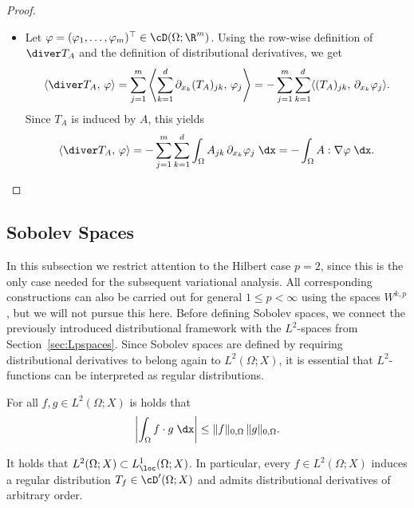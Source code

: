 \begin{proof}
\begin{itemize}
		\item[iii)] Let $\varphi=(\varphi_1,\ldots,\varphi_m)^\top\in\cD(\Omega;\R^m)$. Using the row-wise definition of $\diver T_A$ and the definition of distributional derivatives, we get
		      \begin{equation*}
			      \langle \diver T_A,\,\varphi\rangle
			      =
			      \sum_{j=1}^m \left\langle \sum_{k=1}^d \partial_{x_k}(T_A)_{jk},\,\varphi_j\right\rangle
			      =
			      -\sum_{j=1}^m\sum_{k=1}^d \langle (T_A)_{jk},\,\partial_{x_k}\varphi_j\rangle.
		      \end{equation*}
		      Since $T_A$ is induced by $A$, this yields
		      \begin{equation*}
			      \langle \diver T_A,\,\varphi\rangle
			      =
			      -\sum_{j=1}^m\sum_{k=1}^d \int_\Omega A_{jk}\,\partial_{x_k}\varphi_j\;\dx
			      =
			      -\int_\Omega A:\nabla\varphi\;\dx.
		      \end{equation*}
	\end{itemize}
\end{proof}

\subsection{Sobolev Spaces}

In this subsection we restrict attention to the Hilbert case $p=2$, since this is the only case needed for the subsequent variational analysis. All corresponding constructions can also be carried out for general $1\le p<\infty$ using the spaces $W^{k,p}$, but we will not pursue this here. Before defining Sobolev spaces, we connect the previously introduced distributional framework with the $L^2$-spaces from Section~\ref{sec:Lpspaces}. Since Sobolev spaces are defined by requiring distributional derivatives to belong again to $L^2(\Omega;X)$, it is essential that $L^2$-functions can be interpreted as regular distributions.

\begin{lemma}
	For all $f,g\in L^2(\Omega;X)$ is holds that
	\begin{equation*}
		\left|\int_\Omega f\cdot g\;\dx\right|
		\le
		\|f\|_{0,\Omega}\,\|g\|_{0,\Omega}.
	\end{equation*}
	\eop
\end{lemma}

\begin{proposition}\label{pr:L2_locally_integrable}
	It holds that $L^2(\Omega;X)\subset L^1_\loc(\Omega;X)$. In particular, every $f\in L^2(\Omega;X)$ induces a regular distribution $T_f\in\cD^\prime(\Omega;X)$ and admits distributional derivatives of arbitrary order.
\end{proposition}

